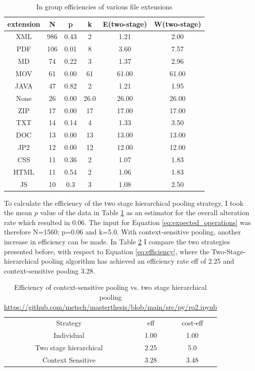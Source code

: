 \begin{table}[H]
    \caption{In group efficiencies of various file extensions}
    \centering
    \begin{tabular}{ c c c c c c}
    \label{tb:efficiency}
     extension & N & p & k & E(\acrshort{two-stage}) & W(\acrshort{two-stage}) \\
     \hline
     XML & 986 & 0.43 & 2 & 1.21  & 2.00 \\  
     \hline
     PDF &106 &0.01 & 8 &  3.60 & 7.57 \\
     \hline
     MD & 74 & 0.22  & 3 & 1.37 & 2.96 \\    
     \hline
     MOV&61 & 0.00 &  61 & 61.00 & 61.00 \\  
     \hline
     JAVA &47 &0.82 & 2  & 1.21 & 1.95 \\  
     \hline
     None & 26 & 0.00 & 26.0 & 26.00 & 26.00	 \\
     \hline
     ZIP & 17 &0.00 &  17 & 17.00 & 17.00 \\
     \hline
     TXT & 14 & 0.14 &  4 & 1.33 & 3.50 \\ 
     \hline
     DOC & 13 & 0.00 &  13 & 13.00 & 13.00 \\   
     \hline
     JP2 & 12 & 0.00 &  12 & 12.00 & 12.00 \\   
     \hline
     CSS & 11 & 0.36 & 2  & 1.07 & 1.83 \\  
     \hline
     HTML & 11 & 0.54 &  2 & 1.06 & 1.83
      \\   
     \hline
     JS & 10 & 0.3 & 3& 1.08 & 2.50
    \end{tabular}
\end{table}

To calculate the efficiency of the two stage hierarchical pooling strategy, I took the mean $p$ value of the data in Table \ref{tb:efficiency} as an estimator for the overall alteration rate which resulted in 0.06. The input for Equation \ref{eq:expected_operations} was therefore N=1560; p=0.06 and k=5.0.
With context-sensitive pooling, another increase in efficiency can be made. In Table \ref{tb:context-sensitive} I compare the two strategies presented before, with respect to Equation \ref{eq:efficiency}, where the Two-Stage-hierarchical pooling algorithm has achieved an efficiency rate \acrshort{eff} of 2.25 and context-sensitive pooling 3.28. 
\begin{table}[H]
    \caption{Efficiency of context-sensitive pooling vs. two stage hierarchical pooling \url{https://github.com/metsch/masterthesis/blob/main/src/py/rq2.ipynb}}
    \centering
    \begin{tabular}{c c c}
    \label{tb:context-sensitive}
    Strategy & \acrshort{eff} & \acrshort{cost-eff} \\
    Individual & 1.00 & 1.00 \\
    Two stage hierarchical &  2.25 & 5.0\\
    Context Sensitive & 3.28 & 3.48
    \end{tabular}
\end{table}

